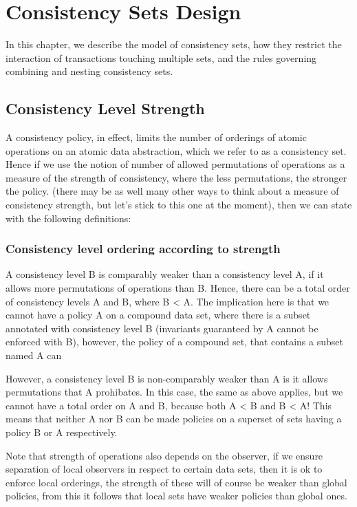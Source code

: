 \section{Consistency Sets Design}

In this chapter, we describe the model of consistency sets, how they restrict
the interaction of transactions touching multiple sets, and the rules governing
combining and nesting consistency sets.

\subsection{Consistency Level Strength}
A consistency policy, in effect, limits the number of orderings of atomic
operations on an atomic data abstraction, which we refer to as a consistency
set. Hence if we use the notion of number
of allowed permutations of operations as a measure of the strength of
consistency, where the less permutations, the stronger the policy.
(there may be as well many other ways to think about a measure of
consistency strength, but let's stick to this one at the moment), then we can
state with the following definitions:

\subsubsection{Consistency level ordering according to strength}
A consistency level B is comparably weaker than a consistency level A, if it
allows more permutations of operations than B. Hence, there can be a total order
of consistency levels A and B, where B < A. The implication here is that we
cannot have a policy A on a compound data set, where there is a subset annotated
with consistency level B (invariants guaranteed by A cannot be enforced with B),
however, the policy of a compound set, that contains a subset named A can 

However, a consistency level B is non-comparably weaker than A is it allows
permutations that A prohibates. In this case, the same as above applies, but we
cannot have a total order on A and B, because both A < B and B < A! This means
that neither A nor B can be made policies on a superset of sets having a policy
B or A respectively. 

Note that strength of operations also depends on the observer, if we ensure
separation of local observers in respect to certain data sets, then it is ok to
enforce local orderings, the strength of these will of course be weaker than
global policies, from this it follows that local sets have weaker policies than
global ones.

